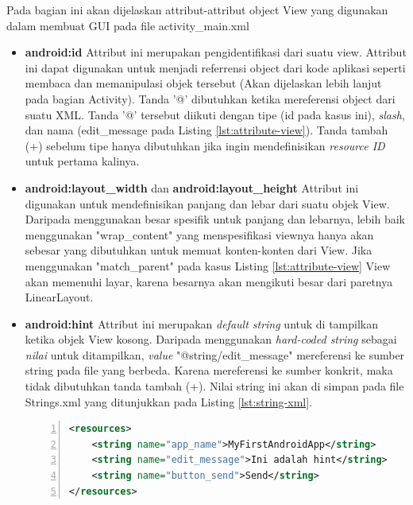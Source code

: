 \documentclass[a4paper,twoside]{article}
\begin{document}
\begin{enumerate}
\label{sssec:attribut_attribut_objek_view}
Pada bagian ini akan dijelaskan attribut-attribut object View yang digunakan dalam membuat GUI pada file activity\_main.xml
\begin{itemize}
	\item \textbf{android:id}
	Attribut ini merupakan pengidentifikasi dari suatu view. Attribut ini dapat digunakan untuk menjadi referrensi object dari kode aplikasi seperti membaca dan memanipulasi objek tersebut (Akan dijelaskan lebih lanjut pada bagian Activity). Tanda '@' dibutuhkan ketika mereferensi object dari suatu XML. Tanda '@' tersebut diikuti dengan tipe (id pada kasus ini), \textit{slash}, dan nama (edit\_message pada Listing \ref{lst:attribute-view}). Tanda tambah (+) sebelum tipe hanya dibutuhkan jika ingin mendefinisikan \textit{resource ID} untuk pertama kalinya.
	\item \textbf{android:layout\_width} dan \textbf{android:layout\_height}
	Attribut ini digunakan untuk mendefinisikan panjang dan lebar dari suatu objek View. Daripada menggunakan besar spesifik untuk panjang dan lebarnya, lebih baik menggunakan "wrap\_content" yang menspesifikasi viewnya hanya akan sebesar yang dibutuhkan untuk memuat konten-konten dari View. Jika menggunakan "match\_parent" pada kasus Listing \ref{lst:attribute-view} View akan memenuhi layar, karena besarnya akan mengikuti besar dari paretnya LinearLayout.


	\item \textbf{android:hint}
	Attribut ini merupakan \textit{default string} untuk di tampilkan ketika objek View kosong. Daripada menggunakan \textit{hard-coded string} sebagai \textit{nilai} untuk ditampilkan, \textit{value} "@string/edit\_message" mereferensi ke sumber string pada file yang berbeda. Karena mereferensi ke sumber konkrit, maka tidak dibutuhkan tanda tambah (+). Nilai string ini akan di simpan pada file Strings.xml yang ditunjukkan pada Listing \ref{lst:string-xml}.
	\begin{lstlisting}[language=xml,numbers=left,breaklines=true,caption={Contoh kode pada string.xml},label={lst:string-xml},language=xml]
<resources>
	<string name="app_name">MyFirstAndroidApp</string>
	<string name="edit_message">Ini adalah hint</string>
	<string name="button_send">Send</string>
</resources>

\end{lstlisting}



\end{itemize}
\end{enumerate}
\end{document}
